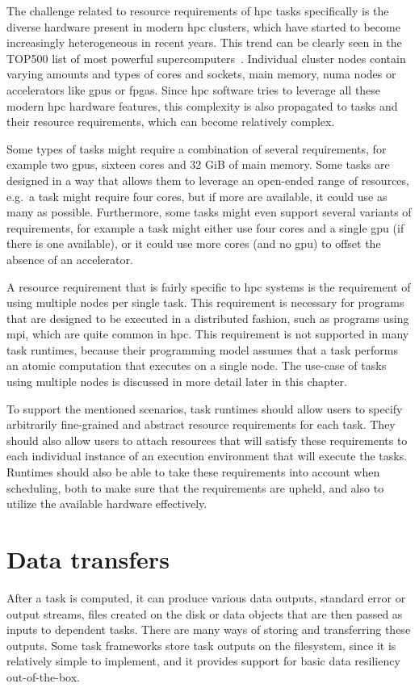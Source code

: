 The challenge related to resource requirements of \gls{hpc} tasks specifically is
the diverse hardware present in modern \gls{hpc} clusters, which have started to
become increasingly heterogeneous in recent years. This trend can be clearly seen in the TOP500
list of most powerful supercomputers~\cite{top500analysis}. Individual cluster nodes contain
varying amounts and types of cores and sockets, main memory, \gls{numa} nodes or
accelerators like \glspl{gpu} or \glspl{fpga}. Since
\gls{hpc} software tries to leverage all these modern \gls{hpc}
hardware features, this complexity is also propagated to tasks and their resource requirements,
which can become relatively complex.

Some types of tasks might require a combination of several requirements, for example two
\glspl{gpu}, sixteen cores and 32 GiB of main memory. Some tasks are designed in a
way that allows them to leverage an open-ended range of resources, e.g.\ a task might require four
cores, but if more are available, it could use as many as possible. Furthermore, some tasks might
even support several variants of requirements, for example a task might either use four cores and a
single \gls{gpu} (if there is one available), or it could use more cores (and no \gls{gpu})
to offset the absence of an accelerator.

A resource requirement that is fairly specific to \gls{hpc} systems is the
requirement of using multiple nodes per single task. This requirement is necessary for programs
that are designed to be executed in a distributed fashion, such as programs using
\gls{mpi}, which are quite common in \gls{hpc}. This requirement
is not supported in many task runtimes, because their programming model assumes that a task
performs an atomic computation that executes on a single node. The use-case of tasks using multiple
nodes is discussed in more detail later in this chapter.

To support the mentioned scenarios, task runtimes should allow users to specify arbitrarily
fine-grained and abstract resource requirements for each task. They should also allow users to
attach resources that will satisfy these requirements to each individual instance of an execution
environment that will execute the tasks. Runtimes should also be able to take these requirements
into account when scheduling, both to make sure that the requirements are upheld, and also to
utilize the available hardware effectively.

\section{Data transfers}
After a task is computed, it can produce various data outputs, standard error or output streams,
files created on the disk or data objects that are then passed as inputs to dependent tasks. There
are many ways of storing and transferring these outputs. Some task frameworks store task outputs on
the filesystem, since it is relatively simple to implement, and it provides support for basic data
resiliency out-of-the-box.

